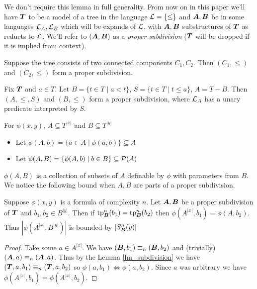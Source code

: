 \documentclass{amsart}
\DeclareMathOperator{\TT}{\boldface T}
\DeclareMathOperator{\A}{\boldface A}
\DeclareMathOperator{\B}{\boldface B}
\begin{document}
We don't require this lemma in full generality. From now on in this paper we'll have $\TT$ to be a model of a tree in the language $\mathcal L = \{\leq\}$ and $\A, \B$ be in some languages $\mathcal L_A, \mathcal L_B$ which will be expands of $\mathcal L$, with $\A, \B$ substructures of $\TT$ as reducts to $\mathcal L$. We'll refer to $(\A, \B)$ as a \emph{proper subdivision} ($\TT$ will be dropped if it is implied from context).

\begin{Example}
	Suppose the tree consists of two connected components $C_1, C_2$. Then $(C_1, \leq)$ and $(C_2, \leq)$ form a proper subdivision.
\end{Example}

\begin{Example} \label{ex_cone}
	Fix $\TT$ and $a \in T$. Let $B = \{t \in T \mid a < t\}$, $S = \{t \in T \mid t \leq a\}$, $A = T - B$. Then $(A, \leq, S)$ and $(B, \leq)$ form a proper subdivision, where $\mathcal L_A$ has a unary predicate interpreted by $S$.
\end{Example}

\begin{Definition} For $\phi(x, y)$, $A \subseteq T^{|x|}$ and $B \subseteq T^{|y|}$
\begin{itemize}
	\item Let $\phi(A, b) = \{a \in A \mid \phi(a, b)\} \subseteq A$
	\item Let $\phi(A, B) = \{\phi(A, b) \mid b \in B\} \subseteq \mathcal P(A)$	
\end{itemize}
\end{Definition}
$\phi(A, B)$ is a collection of subsets of $A$ definable by $\phi$ with parameters from $B$. We notice the following bound when $A, B$ are parts of a proper subdivision.

\begin{Corollary} \label{cor_type_count}
	Suppose $\phi(x,y)$ is a formula of complexity $n$. Let $\A, \B$ be a proper subdivision of $\TT$ and $b_1, b_2 \in B^{|y|}$. Then if $\tp^n_{\B}(b_1) = \tp^n_{\B}(b_2)$ then $\phi(A^{|x|}, b_1) = \phi(A, b_2)$. Thus $|\phi(A^{|x|}, B^{|y|})|$ is bounded by $|S^n_{\B}(y)|$
\end{Corollary}

\begin{proof}
	Take some $a \in A^{|x|}$. We have $(\B, b_1) \equiv_n (\B, b_2)$ and (trivially) $(\A, a) \equiv_n (\A, a)$. Thus by the Lemma \ref{lm_subdivision} we have $(\TT, a, b_1) \equiv_n (\TT, a, b_2)$ so $\phi(a, b_1) \iff \phi(a, b_2)$. Since $a$ was arbitrary we have $\phi(A^{|x|}, b_1) = \phi(A^{|x|}, b_2)$.
\end{proof}
\end{document}
